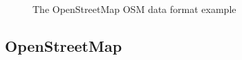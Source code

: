 \begin{figure}[th]
	\centering
	\caption{The OpenStreetMap OSM data format example}
	\label{fig:osmdataformat}
\end{figure}


\subsection{OpenStreetMap}


